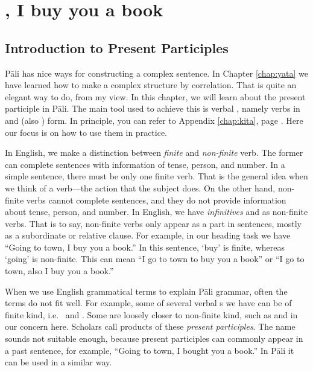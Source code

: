 \chapter{, I buy you a book}\label{chap:prp}

{}
\section*{Introduction to Present Participles}

P\=ali has nice ways for constructing a complex sentence. In Chapter \ref{chap:yata} we have learned how to make a complex structure by correlation. That is quite an elegant way to do, from my view. In this chapter, we will learn about the present participle in P\=ali. The main tool used to achieve this is verbal , namely verbs in  and  (also ) form. In principle, you can refer to Appendix \ref{chap:kita}, page \pageref{pacck10:maana}. Here our focus is on how to use them in practice.

In English, we make a distinction between \emph{finite} and \emph{non-finite} verb. The former can complete sentences with information of tense, person, and number. In a simple sentence, there must be only one finite verb. That is the general idea when we think of a verb---the action that the subject does. On the other hand, non-finite verbs cannot complete sentences, and they do not provide information about tense, person, and number. In English, we have \emph{infinitives} and  as non-finite verbs. That is to say, non-finite verbs only appear as a part in sentences, mostly as a subordinate or relative clause. For example, in our heading task we have ``Going to town, I buy you a book.'' In this sentence, `buy' is finite, whereas `going' is non-finite. This can mean ``I go to town to buy you a book'' or ``I go to town, also I buy you a book.''

When we use English grammatical terms to explain P\=ali grammar, often the terms do not fit well. For example, some of several verbal s we have can be of finite kind, i.e.\  and . Some are loosely closer to non-finite kind, such as  and  in our concern here. Scholars call products of these  \emph{present participles}. The name sounds not suitable enough, because present participles can commonly appear in a past sentence, for example, ``Going to town, I bought you a book.'' In P\=ali it can be used in a similar way.

